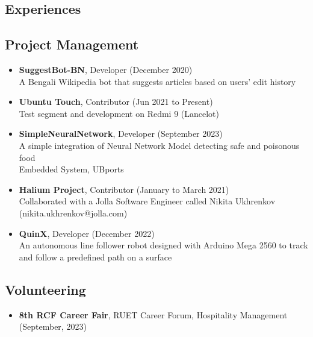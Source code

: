 \documentclass{article}
\begin{document}
\begin{adjustwidth}{0cm}{0cm}
\begin{multicols}{2}
        \section*{Experiences}
        \subsection*{Project Management}
        \begin{itemize}
            \item \textbf{SuggestBot-BN}, Developer (December 2020)\\
                  A Bengali Wikipedia bot that suggests articles based on users' edit history
            \item \textbf{Ubuntu Touch}, Contributor (Jun 2021 to Present)\\
                  Test segment and development on Redmi 9 (Lancelot)
            \item \textbf{SimpleNeuralNetwork}, Developer (September 2023)\\
                  A simple integration of Neural Network Model detecting safe and poisonous food\\
                  Embedded System, UBports
            \item \textbf{Halium Project}, Contributor (January to March 2021)\\
                  Collaborated with a Jolla Software Engineer called Nikita Ukhrenkov (nikita.ukhrenkov@jolla.com)
            \item \textbf{QuinX}, Developer (December 2022)\\
                  An autonomous line follower robot designed with Arduino Mega 2560 to track and follow a predefined path on a surface
        \end{itemize}

        \subsection*{Volunteering}
        \begin{itemize}
            \item \textbf{8th RCF Career Fair}, RUET Career Forum, Hospitality Management (September, 2023)
        \end{itemize}


\end{multicols}
\end{adjustwidth}
\end{document}
